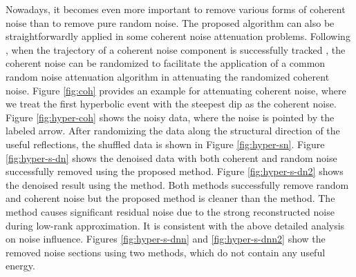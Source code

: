 Nowadays, it becomes even more important to remove various forms of coherent noise than to remove pure random noise. The proposed algorithm can also be straightforwardly applied in some coherent noise attenuation problems. Following \cite{weilin2017}, when the trajectory of a coherent noise component is successfully tracked , the coherent noise can be randomized to facilitate the application of a common random noise attenuation algorithm in attenuating the randomized coherent noise.  Figure \ref{fig:coh} provides an example for attenuating coherent noise, where we treat the first hyperbolic event with the steepest dip as the coherent noise. Figure \ref{fig:hyper-coh} shows the noisy data, where the noise is pointed by the labeled arrow. After randomizing the data along the structural direction of the useful reflections, the shuffled data is shown in Figure \ref{fig:hyper-sn}. Figure \ref{fig:hyper-s-dn} shows the denoised data with both coherent and random noise successfully removed using the proposed method. Figure \ref{fig:hyper-s-dn2} shows the denoised result using the  method.  Both methods successfully remove random and coherent noise but the proposed method is cleaner than the  method. The  method causes significant residual noise due to the strong reconstructed noise during low-rank approximation. It is consistent with the above detailed analysis on noise influence. Figures \ref{fig:hyper-s-dnn} and \ref{fig:hyper-s-dnn2} show the removed noise sections using two methods, which do not contain any useful energy. 

